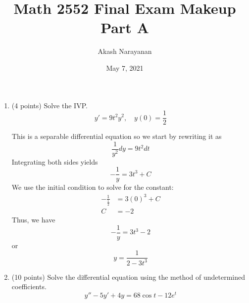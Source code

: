 \documentclass[11pt, titlepage]{article}
\title{Math 2552 Final Exam Makeup Part A}
\author{Akash Narayanan}
\date{May 7, 2021}
\begin{document}
    \maketitle

    \begin{enumerate}
        \item (4 points) Solve the IVP.
        \[
        y' = 9t^2y^2, \quad y(0) = \frac{1}{2}
        \]

        \begin{solution}
            This is a separable differential equation so we start by rewriting it as
            \[
            \frac{1}{y^2} dy = 9t^2 dt
            \]
            Integrating both sides yields
            \[
            -\frac{1}{y} = 3t^3 + C
            \]
            We use the initial condition to solve for the constant:
            \begin{align*}
                -\frac{1}{\frac{1}{2}} &= 3(0)^3 + C \\
                C &= -2
            \end{align*}
            Thus, we have
            \[
            -\frac{1}{y} = 3t^3 - 2
            \]
            or
            \[
            y = \frac{1}{2 - 3t^3}
            \]
        \end{solution}

        \pagebreak

        \item (10 points) Solve the differential equation using the method of undetermined coefficients.
        \[
        y'' - 5y' + 4y = 68\cos t - 12e^t
        \]


\end{enumerate}
\end{document}
